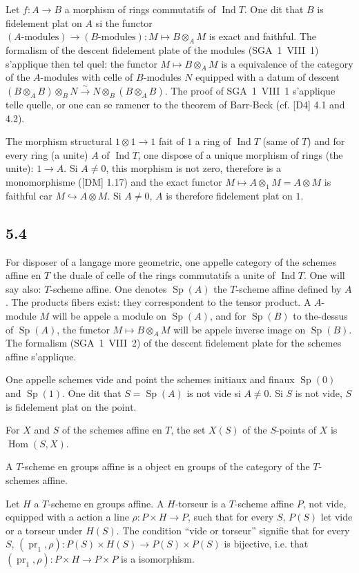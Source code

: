 \documentclass[12pt,a4paper]{article}
\theoremstyle{plain}
\theoremstyle{definition}
\theoremstyle{remark}
\DeclareMathOperator{\Hom}{Hom}
\DeclareMathOperator{\Ind}{Ind}
\DeclareMathOperator{\Sp}{Sp}
\DeclareMathOperator{\pr}{pr}
\begin{document}
Let $f: A 
\to B$ a morphism of rings commutatifs of $\Ind T$. One dit that $B$ is fidelement plat on $A$ si the functor $(A\text{-modules}) 
\to (B\text{-modules}): M 
\mapsto B 
\otimes_A M$ is exact and faithful. The formalism of the descent fidelement plate of the modules (SGA~1~VIII~1) s'applique then tel quel: the functor $M 
\mapsto B 
\otimes_A M$ is a equivalence of the category of the $A$-modules with celle of $B$-modules $N$ equipped with a datum of descent $(B 
\otimes_A B) 
\otimes_B N 
\xrightarrow{\sim} N 
\otimes_B (B 
\otimes_A B)$. The proof of SGA~1~VIII~1 s'applique telle quelle, or one can se ramener to the theorem of Barr-Beck (cf. [D4] 4.1 and 4.2).

The morphism structural $1 
\otimes 1 
\to 1$ fait of $1$ a ring of $\Ind T$ (same of $T$) and for every ring (a unite) $A$ of $\Ind T$, one dispose of a unique morphism of rings (the unite): $1 
\to A$. Si $A 
\neq 0$, this morphism is not zero, therefore is a monomorphisme ([DM] 1.17) and the exact functor $M 
\mapsto A 
\otimes_1 M = A 
\otimes M$ is faithful car $M 
\hookrightarrow A 
\otimes M$. Si $A 
\neq 0$, $A$ is therefore fidelement plat on $1$.

\subsection*{5.4}
For disposer of a langage more geometric, one appelle category of the schemes affine en $T$ the duale of celle of the rings commutatifs a unite of $\Ind T$. One will say also: $T$-scheme affine. One denotes $\Sp(A)$ the $T$-scheme affine defined by $A$. The products fibers exist: they correspondent to the tensor product. A $A$-module $M$ will be appele a module on $\Sp(A)$, and for $\Sp(B)$ to the-dessus of $\Sp(A)$, the functor $M 
\mapsto B 
\otimes_A M$ will be appele inverse image on $\Sp(B)$. The formalism (SGA~1~VIII~2) of the descent fidelement plate for the schemes affine s'applique.

One appelle schemes vide and point the schemes initiaux and finaux $\Sp(0)$ and $\Sp(1)$. One dit that $S = 
\Sp(A)$ is not vide si $A 
\neq 0$. Si $S$ is not vide, $S$ is fidelement plat on the point.

For $X$ and $S$ of the schemes affine en $T$, the set $X(S)$ of the $S$-points of $X$ is $\Hom(S,X)$.

A $T$-scheme en groups affine is a object en groups of the category of the $T$-schemes affine.

Let $H$ a $T$-scheme en groups affine. A $H$-torseur is a $T$-scheme affine $P$, not vide, equipped with a action a line $\rho: P 
\times H 
\to P$, such that for every $S$, $P(S)$ let vide or a torseur under $H(S)$. The condition ``vide or torseur'' signifie that for every $S$, $(\pr_1, 
\rho): P(S) 
\times H(S) 
\to P(S) 
\times P(S)$ is bijective, i.e. that $(\pr_1, 
\rho): P 
\times H 
\to P 
\times P$ is a isomorphism.
\end{document}
